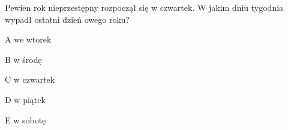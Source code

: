 \begin{tresc}
Pewien rok nieprzestępny rozpoczął się w czwartek. W jakim dniu tygodnia wypadł ostatni dzień owego roku?
\end{tresc}
\begin{wariant}{A} we wtorek \end{wariant}
\begin{wariant}{B} w środę \end{wariant}
\begin{wariant}{C} w czwartek \end{wariant}
\begin{wariant}{D} w piątek \end{wariant}
\begin{wariant}{E} w sobotę \end{wariant}
